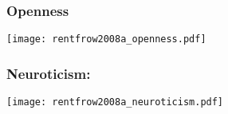 \begin{frame}
  \frametitle{Openness}

  \texttt{[image: rentfrow2008a\_openness.pdf]}

\end{frame}

\begin{frame}
  \frametitle{Neuroticism:}

  \texttt{[image: rentfrow2008a\_neuroticism.pdf]}

\end{frame}













